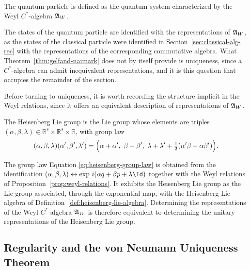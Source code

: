 	\noindent The quantum particle is defined as the quantum system characterized by the Weyl $C^*$-algebra $\mathfrak{A}_W$.
	
	\begin{remark}
		\label{rem:link-to-gelfand-naimark}
		The states of the quantum particle are identified with the representations of $\mathfrak{A}_W$, as the states of the classical particle were identified in Section~\ref{sec:classical-alg-rec} with the representations of the corresponding commutative algebra. What Theorem~\ref{thm:gelfand-naimark} does not by itself provide is uniqueness, since a $C^*$-algebra can admit inequivalent representations, and it is this question that occupies the remainder of the section.
	\end{remark}
	
	\noindent Before turning to uniqueness, it is worth recording the structure implicit in the Weyl relations, since it offers an equivalent description of representations of $\mathfrak{A}_W$.
	
	\begin{definition}
		\label{def:heisenberg-lie-group}
		The Heisenberg Lie group is the Lie group whose elements are triples $(\alpha,\beta,\lambda) \in \mathbb{R}^s \times \mathbb{R}^s \times \mathbb{R}$, with group law
		\begin{equation}
			(\alpha,\beta,\lambda)(\alpha',\beta',\lambda') = \Bigl(\alpha+\alpha',\ \beta+\beta',\ \lambda+\lambda'+\tfrac{1}{2}(\alpha'\beta-\alpha\beta')\Bigr).
			\label{eq:heisenberg-group-law}
		\end{equation}
	\end{definition}
	
	\begin{remark}
		The group law Equation \eqref{eq:heisenberg-group-law} is obtained from the identification $(\alpha,\beta,\lambda) \leftrightarrow \exp\,i(\alpha q + \beta p + \lambda \Id)$ together with the Weyl relations of Proposition~\ref{prop:weyl-relations}. It exhibits the Heisenberg Lie group as the Lie group associated, through the exponential map, with the Heisenberg Lie algebra of Definition~\ref{def:heisenberg-lie-algebra}. Determining the representations of the Weyl $C^*$-algebra $\mathfrak{A}_W$ is therefore equivalent to determining the unitary representations of the Heisenberg Lie group.
	\end{remark}
	
	\subsection*{Regularity and the von Neumann Uniqueness Theorem}
	
